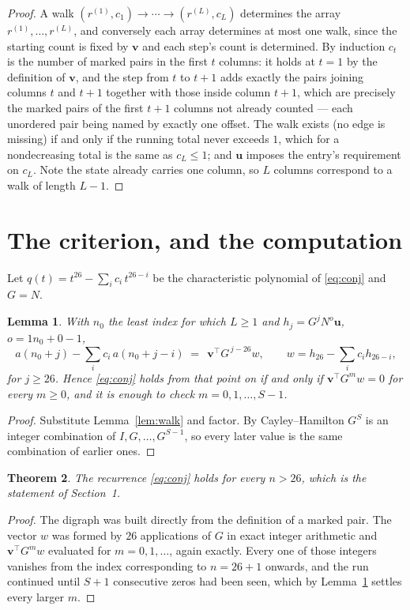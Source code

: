 \documentclass[11pt,a4paper]{article}
\theoremstyle{plain}
\newtheorem{theorem}{Theorem}
\newtheorem{lemma}[theorem]{Lemma}
\theoremstyle{definition}
\begin{document}
\begin{proof}
A walk $(r^{(1)},c_1)\to\cdots\to(r^{(L)},c_L)$ determines the array
$r^{(1)},\dots,r^{(L)}$, and conversely each array determines at most one walk, since the
starting count is fixed by $\mathbf{v}$ and each step's count is determined. By induction
$c_t$ is the number of marked pairs in the first $t$ columns: it holds at $t=1$ by the
definition of $\mathbf{v}$, and the step from $t$ to $t+1$ adds exactly the pairs joining
columns $t$ and $t+1$ together with those inside column $t+1$, which are precisely the marked
pairs of the first $t+1$ columns not already counted --- each unordered pair being named by
exactly one offset. The walk exists (no edge is missing) if and only if the running total
never exceeds $1$, which for a nondecreasing total is the same as $c_L\le1$; and
$\mathbf{u}$ imposes the entry's requirement on $c_L$. Note the state already carries one
column, so $L$ columns correspond to a walk of length $L-1$.
\end{proof}

\section{The criterion, and the computation}

Let $q(t)=t^{26}-\sum_i c_i\,t^{26-i}$ be the characteristic polynomial of
\eqref{eq:conj} and $G=N$.

\begin{lemma}\label{lem:crit}
With $n_0$ the least index for which $L\ge1$ and $h_j=G^{j}N^{o}\mathbf{u}$,
$o=1n_0+0-1$,
\[
a(n_0+j)-\sum_i c_i\,a(n_0+j-i)\;=\;\,\mathbf{v}^{\!\top}G^{\,j-26}w,
\qquad w=h_{26}-\sum_i c_i h_{26-i},
\]
for $j\ge26$. Hence \eqref{eq:conj} holds from that point on if and only if
$\mathbf{v}^{\!\top}G^{m}w=0$ for every $m\ge0$, and it is enough to check
$m=0,1,\dots,S-1$.
\end{lemma}

\begin{proof}
Substitute Lemma~\ref{lem:walk} and factor. By Cayley--Hamilton $G^{S}$ is an integer
combination of $I,G,\dots,G^{S-1}$, so every later value is the same combination of earlier
ones.
\end{proof}

\begin{theorem}
The recurrence \eqref{eq:conj} holds for every $n>26$, which is the statement of
Section~1.
\end{theorem}

\begin{proof}
The digraph was built directly from the definition of a marked pair. The vector $w$ was
formed by $26$ applications of $G$ in exact integer arithmetic and
$\mathbf{v}^{\!\top}G^{m}w$ evaluated for $m=0,1,\dots$, again exactly. Every one of
those integers vanishes from the index corresponding to $n=26+1$ onwards, and the run
continued until $S+1$ consecutive zeros had been seen, which by Lemma~\ref{lem:crit}
settles every larger $m$.
\end{proof}
\end{document}
